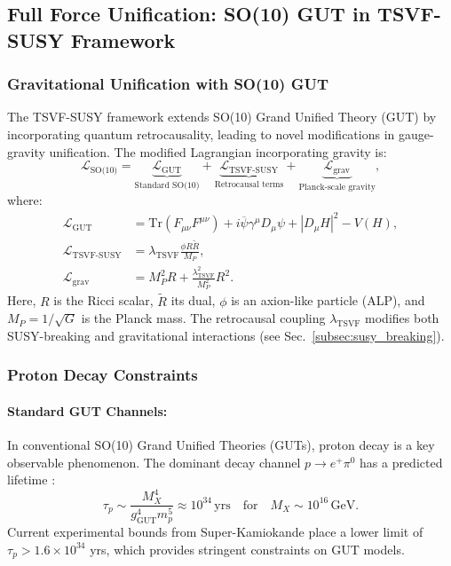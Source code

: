 \documentclass[twocolumn,superscriptaddress,floatfix]{revtex4-2}
\begin{document}
\subsection{Full Force Unification: SO(10) GUT in TSVF-SUSY Framework}
\label{subsec:full_unification}

\subsubsection{Gravitational Unification with SO(10) GUT}
\label{subsec:grav_unification}

The TSVF-SUSY framework extends SO(10) Grand Unified Theory (GUT) by incorporating quantum retrocausality, leading to novel modifications in gauge-gravity unification. The modified Lagrangian incorporating gravity is:
\begin{equation}
\mathcal{L}_{\text{SO(10)}} = \underbrace{\mathcal{L}_{\text{GUT}}}_{\text{Standard SO(10)}} + \underbrace{\mathcal{L}_{\text{TSVF-SUSY}}}_{\text{Retrocausal terms}} + \underbrace{\mathcal{L}_{\text{grav}}}_{\text{Planck-scale gravity}},
\end{equation}
where:
\begin{align}
\mathcal{L}_{\text{GUT}} &= \text{Tr}(F_{\mu\nu}F^{\mu\nu}) + i\overline{\psi}\gamma^\mu D_\mu\psi + |D_\mu H|^2 - V(H), \label{eq:L_GUT} \\
\mathcal{L}_{\text{TSVF-SUSY}} &= \lambda_{\text{TSVF}}\frac{\phi R\tilde{R}}{M_P}, \label{eq:L_TSVF} \\
\mathcal{L}_{\text{grav}} &= M_P^2 R + \frac{\lambda_{\text{TSVF}}^2}{M_P^2}R^2. \label{eq:L_grav}
\end{align}
Here, $R$ is the Ricci scalar, $\tilde{R}$ its dual, $\phi$ is an axion-like particle (ALP), and $M_P = 1/\sqrt{G}$ is the Planck mass. The retrocausal coupling $\lambda_{\text{TSVF}}$ modifies both SUSY-breaking and gravitational interactions (see Sec.~\ref{subsec:susy_breaking}).

 \subsubsection{Proton Decay Constraints}
\label{subsec:proton_decay}

\paragraph{Standard GUT Channels:} 
In conventional SO(10) Grand Unified Theories (GUTs), proton decay is a key observable phenomenon. The dominant decay channel $p \to e^+ \pi^0$ has a predicted lifetime \cite{SuperK}:
\begin{equation}
\tau_p \sim \frac{M_X^4}{g_{\text{GUT}}^4 m_p^5} \approx 10^{34}\,\text{yrs}\quad \text{for}\quad M_X \sim 10^{16}\,\text{GeV}. \label{eq:tau_std}
\end{equation}
Current experimental bounds from Super-Kamiokande place a lower limit of $\tau_p > 1.6 \times 10^{34}$ yrs, which provides stringent constraints on GUT models.
\end{document}
